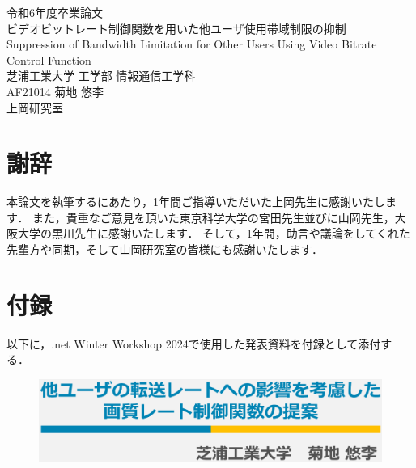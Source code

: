 \documentclass[a4paper,12pt,report]{jsbook}
\begin{document}
%
%
\begin{titlepage}
\begin{center}
{\large 令和6年度卒業論文\\}
\vspace{2.5cm}
{\HUGE ビデオビットレート制御関数を用いた他ユーザ使用帯域制限の抑制\\}
{\huge Suppression of Bandwidth Limitation for Other Users Using Video Bitrate Control Function\\}
\vspace{3cm}
{\Large
  芝浦工業大学 工学部 情報通信工学科\\
  \vspace{3mm}AF21014 菊地 悠李\\
  \vspace{2cm}上岡研究室\\
}%
\end{center}
\end{titlepage}
\tableofcontents
\listoffigures%
\listoftables%
\newpage
\newpage
{}
\setcounter{page}{1}








\chapter*{謝辞}
本論文を執筆するにあたり，1年間ご指導いただいた上岡先生に感謝いたします．
また，貴重なご意見を頂いた東京科学大学の宮田先生並びに山岡先生，大阪大学の黒川先生に感謝いたします．
そして，1年間，助言や議論をしてくれた先輩方や同期，そして山岡研究室の皆様にも感謝いたします．

\chapter*{付録}
以下に，.net Winter Workshop 2024で使用した発表資料を付録として添付する．

\begin{figure}[th]
  \centering
  \includegraphics[scale=0.45]{1.eps}
\end{figure}
\end{document}
